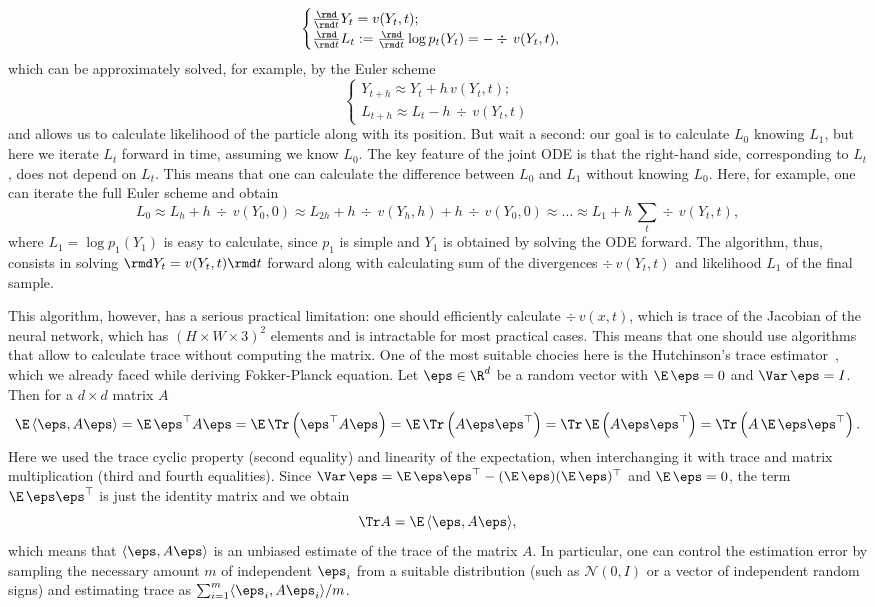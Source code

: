 \[
    \begin{cases}
        \frac{\rmd}{\rmd t} Y_t = v(Y_t, t);\\
        \frac{\rmd}{\rmd t} L_t := \frac{\rmd}{\rmd t} \log p_t(Y_t) = -\div\, v(Y_t, t),
    \end{cases}
\]
which can be approximately solved, for example, by the Euler scheme
\[
    \begin{cases}
        Y_{t + h} \approx Y_t + h\, v(Y_t, t);\\
        L_{t + h} \approx L_t - h\, \div \, v(Y_t, t)
    \end{cases}
\]
and allows us to calculate likelihood of the particle along with its position. But wait a second: our goal is to calculate $L_0$ knowing $L_1$, but here we iterate $L_t$ forward in time, assuming we know $L_0$. The key feature of the joint ODE is that the right-hand side, corresponding to $L_t$, does not depend on $L_t$. This means that one can calculate the difference between $L_0$ and $L_1$ without knowing $L_0$. Here, for example, one can iterate the full Euler scheme and obtain
\[
    L_0 \approx L_{h} + h\, \div \, v(Y_0, 0) \approx L_{2h} + h\, \div\, v(Y_h, h) + h\, \div \, v(Y_0, 0) \approx \ldots \approx L_1 + h\,\sum\limits_{t} \div \, v(Y_t, t),
\]
where $L_1 = \log p_1(Y_1)$ is easy to calculate, since $p_1$ is simple and $Y_1$ is obtained by solving the ODE forward. The algorithm, thus, consists in solving $\rmd Y_t = v(Y_t, t) \rmd t$ forward along with calculating sum of the divergences $\div\, v(Y_t, t)$ and likelihood $L_1$ of the final sample.

This algorithm, however, has a serious practical limitation: one should efficiently calculate $\div\, v(x, t)$, which is trace of the Jacobian of the neural network, which has $ (H \times W \times 3)^2$ elements and is intractable for most practical cases. This means that one should use algorithms that allow to calculate trace without computing the matrix. One of the most suitable chocies here is the Hutchinson's trace estimator~\cite{hutchinson1989stochastic}, which we already faced while deriving Fokker-Planck equation. Let $\eps \in \R^{d}$ be a random vector with $\E \,\eps = 0$ and $\Var\, \eps = I$. Then for a $d \times d$ matrix $A$
\[
    \E \, \langle \eps, A \eps \rangle = \E\, \eps^\top A \eps = \E\, \Tr\left(\eps^\top A \eps\right) = \E\,\Tr \left(A \eps \eps^\top\right) = \Tr\, \E \left(A \eps \eps^\top\right) = \Tr\left(A\, \E\, \eps \eps^\top\right).
\]
Here we used the trace cyclic property (second equality) and linearity of the expectation, when interchanging it with trace and matrix multiplication (third and fourth equalities). Since $\Var \, \eps = \E \, \eps \eps^\top - (\E\, \eps)(\E\, \eps)^\top$ and $\E \, \eps = 0$, the term $\E \, \eps \eps^\top$ is just the identity matrix and we obtain
\[
    \Tr A = \E \, \langle \eps, A \eps \rangle, 
\]
which means that $\langle \eps, A \eps \rangle$ is an unbiased estimate of the trace of the matrix $A$. In particular, one can control the estimation error by sampling the necessary amount $m$ of independent $\eps_i$ from a suitable distribution (such as $\mathcal{N}(0, I)$ or a vector of independent random signs) and estimating trace as $\sum_{i = 1}^{m} \langle \eps_i, A \eps_i \rangle / m$. 

